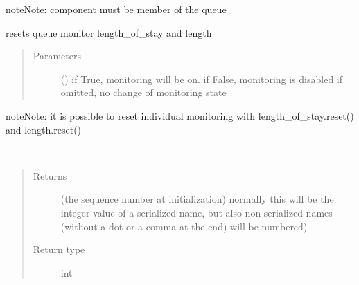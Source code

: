 \documentclass[letterpaper,10pt,english]{sphinxmanual}
\begin{document}
\begin{fulllineitems}
\begin{fulllineitems}
\begin{quote}
\begin{description}
\end{description}\end{quote}

\begin{sphinxadmonition}{note}{Note:}
component must be member of the queue
\end{sphinxadmonition}

\end{fulllineitems}


\begin{fulllineitems}
\label{\detokenize{Reference:salabim.Queue.reset_monitors}}
resets queue monitor length\_of\_stay and length
\begin{quote}\begin{description}
\item[{Parameters}] \leavevmode
{} () \textendash{} if True, monitoring will be on. 
if False, monitoring is disabled 
if omitted, no change of monitoring state

\end{description}\end{quote}

\begin{sphinxadmonition}{note}{Note:}
it is possible to reset individual monitoring with length\_of\_stay.reset() and length.reset()
\end{sphinxadmonition}

\end{fulllineitems}


\begin{fulllineitems}
\label{\detokenize{Reference:salabim.Queue.sequence_number}}~\begin{quote}\begin{description}
\item[{Returns}] \leavevmode
{} \textendash{} (the sequence number at initialization) 
normally this will be the integer value of a serialized name,
but also non serialized names (without a dot or a comma at the end)
will be numbered)

\item[{Return type}] \leavevmode
int


\end{description}
\end{quote}
\end{fulllineitems}
\end{fulllineitems}
\end{document}

